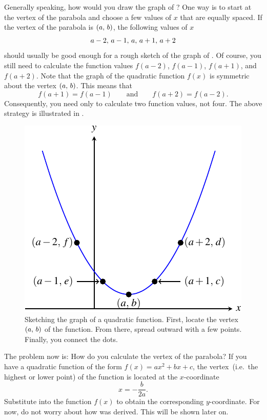 \documentclass[a4paper,oneside,12pt]{article}
\begin{document}
Generally speaking, how would you draw the graph of
?  One way is to start at the
vertex of the parabola and choose a few values of $x$ that are equally
spaced.  If the vertex of the parabola is $\left\lparen{a},\, {b}\right\rparen$, the
following values of $x$
\[
{a-2},\, {a-1},\, {a},\, {a+1},\, {a+2}
\]
should usually be good enough for a rough sketch of the graph of
.  Of course, you still need
to calculate the function values $f(a-2)$, $f(a-1)$, $f(a+1)$, and
$f(a+2)$.  Note that the graph of the quadratic function $f(x)$ is
symmetric about the vertex $\left\lparen{a},\, {b}\right\rparen$.  This means that
\[
f(a+1) = f(a-1)
\qquad
\text{and}
\qquad
f(a+2) = f(a-2).
\]
Consequently, you need only to calculate two function values, not
four.  The above strategy is illustrated in
.

\begin{figure}[!htbp]
\centering
\includegraphics[scale=1.2]{image/07/a1-bminus4-c10.pdf}
\caption{%
  Sketching the graph of a quadratic function.  First, locate the
  vertex $\left\lparen{a},\, {b}\right\rparen$ of the function.  From there, spread outward
  with a few points.  Finally, you connect the dots.
}
\label{fig:sketch_parabola}
\end{figure}

The problem now is: How do you calculate the vertex of the parabola?
If you have a quadratic function of the form $f(x) = ax^2 + bx + c$,
the vertex~(i.e.~the highest or lower point) of the function is
located at the $x$-coordinate
\begin{equation}
\label{eqn:parabola_tip_x_coordinate}
x
=
-\frac{b}{2a}.
\end{equation}
Substitute  into the
function $f(x)$ to obtain the corresponding $y$-coordinate.  For now,
do not worry about how  was
derived.  This will be shown later on.
\end{document}
